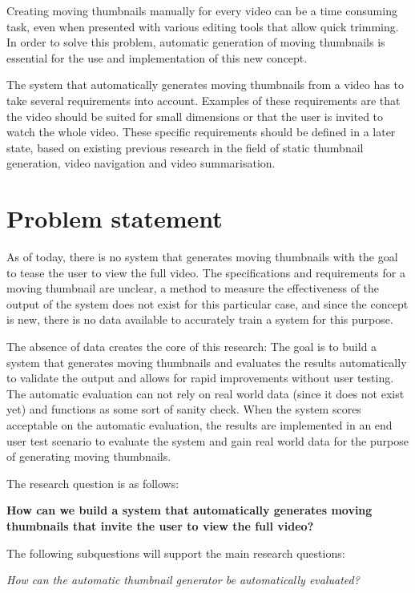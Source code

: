 \documentclass{../resources/acm_proc_article-sp}
\begin{document}
Creating moving thumbnails manually for every video can be a time consuming task, even when presented with various editing tools that allow quick trimming. In order to solve this problem,  automatic generation of moving thumbnails is essential for the use and implementation of this new concept.

The system that automatically generates moving thumbnails from a video has to take several requirements into account. Examples of these requirements are that the video should be suited for small dimensions or that the user is invited to watch the whole video. These specific requirements should be defined in a later state, based on existing previous research in the field of static thumbnail generation, video navigation and video summarisation.

\section{Problem statement}

As of today, there is no system that generates moving thumbnails with the goal to tease the user to view the full video. The specifications and requirements for a moving thumbnail are unclear, a method to measure the effectiveness of the output of the system does not exist for this particular case, and since the concept is new, there is no data available to accurately train a system for this purpose.

The absence of data creates the core of this research: The goal is to build a system that generates moving thumbnails and evaluates the results automatically to validate the output and allows for rapid improvements without user testing. The automatic evaluation can not rely on real world data (since it does not exist yet) and functions as some sort of sanity check. When the system scores acceptable on the automatic evaluation, the results are implemented in an end user test scenario to evaluate the system and gain real world data for the purpose of generating moving thumbnails.

The research question is as follows:

\textbf{How can we build a system that automatically generates moving thumbnails that invite the user to view the full video?}

The following subquestions will support the main research questions:

\textit{How can the automatic thumbnail generator be automatically evaluated?}
\end{document}
